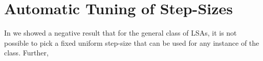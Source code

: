 \section{Automatic Tuning of Step-Sizes}
\begin{comment}
We now argue, in a heuristic manner, as to why constant step-size with PR-averaging might be a principled idea, especially in TD type algorithms. Consider the following LSA with time varying step-sizes $\alpha_t>0$
\begin{align}
\theta_t=\theta_{t-1}+\alpha_t(b_t-A_t\theta_{t-1}).
\end{align}
It is known from asymptotic results by \cite{borkarbook,kushner}\todoch{Check about Kushner} that in order to handle the noise the step-sizes have to be diminishing i.e., $\alpha_t\ra$, unsummable i.e., $\sum_{t \geq 0}\alpha_t=\infty$ and square summable $\sum_{t\geq 0}\alpha_t^2<\infty$. We now look at two specific diminishing step-size sequences, to illustrate the issues that the diminishing step-sizes presents us with. In what follows, we assume that the maximum eigevalue of $\EE{A_t}$ is less that $1$.
\begin{itemize}[leftmargin=*, before = \leavevmode\vspace{-\baselineskip}]
\item \textbf{$\alpha_t=\frac{1}{t}$\footnote{While $\frac{c}{t}$, $c\geq 0$ is more general, it is enough to consider $\frac1t$ by accommodating the multiple $c$ as part of the matrix $A_t$}} is known yield a rate of $\frac{1}{t^{\lambda_{\min}}}$, where $\lambda_{\min}$ is the smallest real part of the eigen values of the matrix $\EE{A_t}$.
\item \textbf{$\alpha_t=\frac{c}{c+t}$} is another example, where the step size decays at a rate $\frac{1}{t/c}$. The rate of decay of error in this case turns out to be $\frac{c^2\sigma_b^2}{t}$, whenever $c>\frac{1}{\lambda_{\min}}$, which can be ensured only when $\lambda_{\min}$ is known.
\end{itemize}
In contrast, in the case of constant step-size with PR-averaging, not knowing the problem instance can result in instability, and when we manage to choose a step-size that results in stable behavior, the rates obtained in \Cref{th:pdrate,cor:as} hold for it. Using this observation, the constant-step size can be set in a more prinicipled manner as showing the pseudocode below.
\end{comment}
In  we showed a negative result that for the general class of LSAs, it is not possible to pick a fixed uniform step-size that can be used for any instance of the class. Further,
